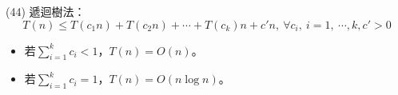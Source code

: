 \item \begin{theorem}{(44)} 遞迴樹法：\begin{equation}
    T(n) \le T(c_1n) + T(c_2n) + \cdots + T(c_k)n + c'n, \ \forall c_i, \ i = 1, \ \cdots, k, c' > 0    
    \end{equation}\begin{itemize}
        \item 若$\sum_{i = 1}^{k} c_i < 1$，$T(n) = O(n)$。
        \item 若$\sum_{i = 1}^{k} c_i = 1$，$T(n) = O(n\log n)$。
    \end{itemize}
\end{theorem}
